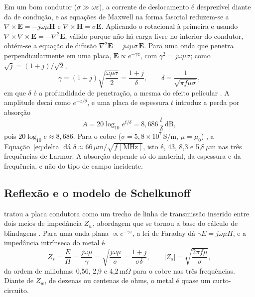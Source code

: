 \documentclass[portuguese]{sbcreviews-2025}%
\begin{document}
Em um bom condutor ($\sigma \gg \omega\varepsilon$), a corrente de deslocamento é desprezível diante da de condução, e as equações de Maxwell na forma fasorial reduzem-se a $\nabla\times\mathbf{E} = -j\omega\mu\mathbf{H}$ e $\nabla\times\mathbf{H} = \sigma\mathbf{E}$. Aplicando o rotacional à primeira e usando $\nabla\times\nabla\times\mathbf{E} = -\nabla^2\mathbf{E}$, válido porque não há carga livre no interior do condutor, obtém-se a equação de difusão $\nabla^2\mathbf{E} = j\omega\mu\sigma\,\mathbf{E}$. Para uma onda que penetra perpendicularmente em uma placa, $\mathbf{E} \propto e^{-\gamma z}$, com $\gamma^2 = j\omega\mu\sigma$; como $\sqrt{j} = (1+j)/\sqrt{2}$,
\begin{equation}
\gamma = (1+j)\sqrt{\frac{\omega\mu\sigma}{2}} = \frac{1+j}{\delta}, \qquad \delta = \frac{1}{\sqrt{\pi f \mu \sigma}},
\label{eq:delta}
\end{equation}
em que $\delta$ é a profundidade de penetração, a mesma do efeito pelicular \citep{pozar2012}. A amplitude decai como $e^{-z/\delta}$, e uma placa de espessura $t$ introduz a perda por absorção
\begin{equation}
A = 20\log_{10} e^{t/\delta} = 8{,}686\,\frac{t}{\delta}\ \mathrm{dB},
\label{eq:A}
\end{equation}
pois $20\log_{10} e \approx 8{,}686$. Para o cobre ($\sigma = 5{,}8\times10^{7}$\,S/m, $\mu = \mu_0$) \citep{pozar2012}, a Equação~\eqref{eq:delta} dá $\delta \approx 66\,\mu\mathrm{m}/\sqrt{f\,[\mathrm{MHz}]}$, isto é, 43, 8,3 e 5,8\,$\mu$m nas três frequências de Larmor. A absorção depende só do material, da espessura e da frequência, e não do tipo de campo incidente.

\subsection{Reflexão e o modelo de Schelkunoff}
\label{subsec:reflexao}

\citet{schelkunoff1943} tratou a placa condutora como um trecho de linha de transmissão inserido entre dois meios de impedância $Z_w$, abordagem que se tornou a base do cálculo de blindagens \citep{ott2009, paul2006}. Para uma onda plana $\propto e^{-\gamma z}$, a lei de Faraday dá $\gamma E = j\omega\mu H$, e a impedância intrínseca do metal é
\begin{equation}
Z_s = \frac{E}{H} = \frac{j\omega\mu}{\gamma} = \sqrt{\frac{j\omega\mu}{\sigma}} = \frac{1+j}{\sigma\delta},
\qquad
|Z_s| = \sqrt{\frac{2\pi f\mu}{\sigma}},
\label{eq:zs}
\end{equation}
da ordem de miliohms: 0,56, 2,9 e 4,2\,m$\Omega$ para o cobre nas três frequências. Diante de $Z_w$, de dezenas ou centenas de ohms, o metal é quase um curto-circuito.
\end{document}
